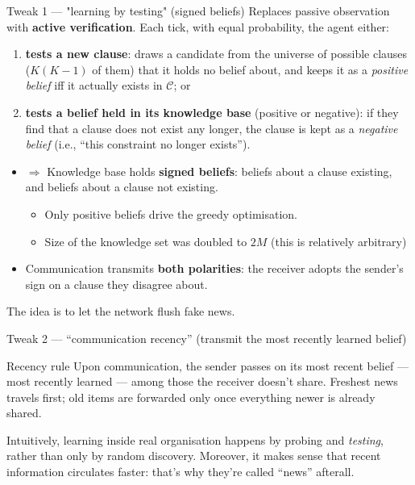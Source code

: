 \documentclass[aspectratio=169,11pt]{beamer}
\begin{document}
\begin{frame}{Tweak 1 --- "learning by testing" (signed beliefs)}
  Replaces passive observation with \textbf{active verification}. Each tick, with equal
  probability, the agent either:
  \begin{enumerate}
    \item \textbf{tests a new clause}: draws a candidate from the universe of possible
          clauses ($K(K-1)$ of them) that it holds no belief about, and keeps it as a
          \emph{positive belief} iff it actually exists in $\mathcal{C}$; or
    \item \textbf{tests a belief held in its knowledge base} (positive or negative): if they find that a clause does not exist any longer, the clause is kept as a \emph{negative belief} (i.e., ``this constraint no longer exists'').
  \end{enumerate}
  \vspace{2pt}
  \begin{itemize}
    \item $\Rightarrow$ Knowledge base holds \textbf{signed beliefs}: beliefs about a clause existing, and beliefs about a clause not existing. 
      \begin{itemize}
        \item Only positive beliefs drive the greedy optimisation.
        \item Size of the knowledge set was doubled to $2M$ (this is relatively arbitrary)
      \end{itemize}
    \item Communication transmits \textbf{both polarities}: the receiver adopts the
          sender's sign on a clause they disagree about.
    
  \end{itemize}
   The idea is to let the network flush fake news.
\end{frame}

\begin{frame}{Tweak 2 --- ``communication recency'' (transmit the most recently learned belief) }
  \begin{block}{Recency rule}
    Upon communication, the sender passes on its most recent belief --- most
    recently learned --- among those the receiver doesn't share. Freshest news travels first; old items
    are forwarded only once everything newer is already shared.
  \end{block}
  \vspace{2pt}
 Intuitively, learning inside real organisation happens by probing and \textit{testing}, rather than only by random discovery. Moreover, it makes sense that recent information circulates faster: that's why they're called ``news'' afterall.
  \vspace{4pt}
\end{frame}
\end{document}

